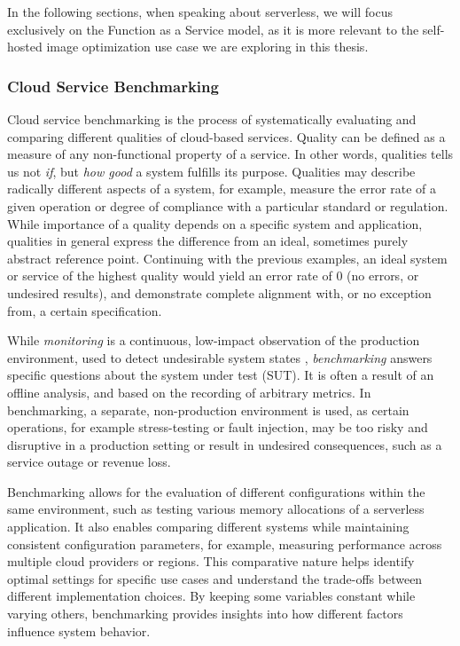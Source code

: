 
In the following sections, when speaking about serverless, we will focus exclusively on the Function as a Service model, as it is more relevant to the self-hosted image optimization use case we are exploring in this thesis.


\subsubsection{Cloud Service Benchmarking}

Cloud service benchmarking is the process of systematically evaluating and comparing different qualities of cloud-based services. Quality can be defined as a measure of any non-functional property of a service. In other words, qualities tells us not \emph{if}, but \emph{how good} a system fulfills its purpose. Qualities may describe radically different aspects of a system, for example, measure the error rate of a given operation or degree of compliance with a particular standard or regulation. While importance of a quality depends on a specific system and application, qualities in general express the difference from an ideal, sometimes purely abstract reference point. Continuing with the previous examples, an ideal system or service of the highest quality would yield an error rate of 0 (no errors, or undesired results), and demonstrate complete alignment with, or no exception from, a certain specification.

While \emph{monitoring} is a continuous, low-impact observation of the production environment, used to detect undesirable system states \cite{bermbach2017cloud}, \emph{benchmarking} answers specific questions about the system under test (SUT). It is often a result of an offline analysis, and based on the recording of arbitrary metrics. In benchmarking, a separate, non-production environment is used, as certain operations, for example stress-testing or fault injection, may be too risky and disruptive in a production setting or result in undesired consequences, such as a service outage or revenue loss.

Benchmarking allows for the evaluation of different configurations within the same environment, such as testing various memory allocations of a serverless application. It also enables comparing different systems while maintaining consistent configuration parameters, for example, measuring performance across multiple cloud providers or regions. This comparative nature helps identify optimal settings for specific use cases and understand the trade-offs between different implementation choices. By keeping some variables constant while varying others, benchmarking provides insights into how different factors influence system behavior.

